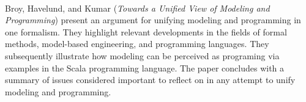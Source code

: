 

\ \hline \ %

Broy, Havelund, and Kumar
\cite{isola-2016-broy}
({\em Towards a Unified View of Modeling and Programming})
present an argument for unifying modeling and programming in one 
formalism. They highlight relevant developments in the fields 
of formal methods, model-based engineering, and programming 
languages. They subsequently illustrate how modeling can be 
perceived as programing via examples in the Scala 
programming language. The paper concludes with a summary of
issues considered important to reflect on in any attempt to 
unify modeling and programming.
